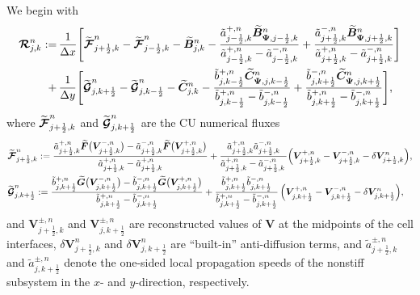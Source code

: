 \documentclass[preprint,12pt]{elsarticle}
\newcommand{\dx}{\Delta x}
\newcommand{\dy}{\Delta y}
\newcommand{\kph}{{k+\frac{1}{2}}}
\newcommand{\kmh}{{k-\frac{1}{2}}}
\newcommand{\jph}{{j+\frac{1}{2}}}
\newcommand{\jmh}{{j-\frac{1}{2}}}
\begin{document}
We begin with
\begin{equation}
	\begin{aligned}
		\bm{{\cal R}}_{j,k}^n:=&\,\frac{1}{\dx}\Bigg[\widetilde{\bm{{\cal F}}}_{\jph,k}^n-\widetilde{\bm{{\cal F}}}_{\jmh,k}^n-
		\widetilde{\bm B}_{j,k}^n-\frac{\tilde a^{+,n}_{\jmh,k}\widetilde{\bm B}_{\bm\Psi,\jmh,k}^n}
		{\tilde a^{+,n}_{\jmh,k}-\tilde a^{-,n}_{\jmh,k}}+
		\frac{\tilde a^{-,n}_{\jph,k}\widetilde{\bm B}_{\bm\Psi,\jph,k}^n}{\tilde a^{+,n}_{\jph,k}-\tilde a^{-,n}_{\jph,k}}\Bigg]\\
		+&\,\frac{1}{\dy}\Bigg[\widetilde{\bm{{\cal G}}}_{j,\kph}^n-\widetilde{\bm{{\cal G}}}_{j,\kmh}^n-\widetilde{\bm C}_{j,k}^n
		-\frac{\tilde b^{+,n}_{j,\kmh}\widetilde{\bm C}_{\bm\Psi,j,\kmh}^n}{\tilde b^{+,n}_{j,\kmh}-\tilde b^{-,n}_{j,\kmh}}+
		\frac{\tilde b^{-,n}_{j,\kph}\widetilde{\bm C}_{\bm\Psi,j,\kph}^n}{\tilde b^{+,n}_{j,\kph}-\tilde b^{-,n}_{j,\kph}}\Bigg],
	\end{aligned}
	\label{3.32}
\end{equation}
where $\widetilde{\bm{{\cal F}}}_{\jph,k}^n$ and $\widetilde{\bm{{\cal G}}}_{j,\kph}^n$ are the CU numerical fluxes
$$
\begin{aligned}
	&\widetilde{\bm{{\cal F}}}_{\jph,k}^n:=\frac{\tilde a^{+,n}_{\jph,k}\widetilde{\bm F}\big(\bm V^{-,n}_{\jph,k}\big)-
		\tilde a^{-,n}_{\jph,k}\widetilde{\bm F}\big(\bm V^{+,n}_{\jph,k}\big)}{\tilde a^{+,n}_{\jph,k}-\tilde a^{+,n}_{\jph,k}}+
	\frac{\tilde a^{+,n}_{\jph,k}\tilde a^{-,n}_{\jph,k}}{\tilde a^{+,n}_{\jph,k}-\tilde a^{-,n}_{\jph,k}\,}
	\Big(\bm V^{+,n}_{\jph,k}-\bm V^{-,n}_{\jph,k}-\delta\bm V_{\jph,k}^n\Big),\\
	&\widetilde{\bm{{\cal G}}}_{j,\kph}^n:=\frac{\tilde b^{+,n}_{j,\kph}\widetilde{\bm G}\big(\bm V^{-,n}_{j,\kph}\big)-
		\tilde b^{-,n}_{j,\kph}\widetilde{\bm G}\big(\bm V^{+,n}_{j,\kph}\big)}{\tilde b^{+,n}_{j,\kph}-\tilde b^{-,n}_{j,\kph}}+
	\frac{\tilde b^{+,n}_{j,\kph}\tilde b^{-,n}_{j,\kph}}{\tilde b^{+,n}_{j,\kph}-\tilde b^{-,n}_{j,\kph}}\,
	\Big(\bm V^{+,n}_{j,\kph}-\bm V^{-,n}_{j,\kph}-\delta\bm V_{j,\kph}^n\Big),
\end{aligned}
$$
and $\bm V^{\pm,n}_{\jph,k}$ and $\bm V^{\pm,n}_{j,\kph}$ are reconstructed values of $\bm V$ at the midpoints of the cell interfaces,
$\delta\bm V_{\jph,k}^n$ and $\delta\bm V_{j,\kph}^n$ are ``built-in'' anti-diffusion terms, and $\tilde a^{\pm,n}_{\jph,k}$ and
$\tilde a^{\pm,n}_{j,\kph}$ denote the one-sided local propagation speeds of the nonstiff subsystem in the $x$- and $y$-direction,
respectively.
\end{document}

